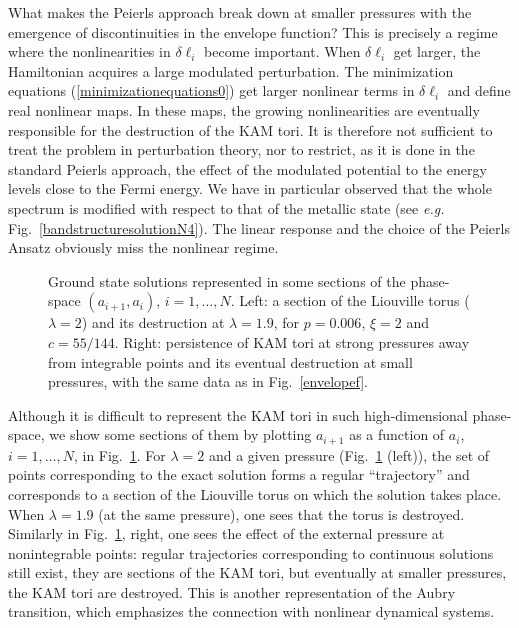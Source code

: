 \documentclass[]{revtex4-1}
\begin{document}
What makes the Peierls approach break down at smaller pressures with the emergence of discontinuities in the envelope function? This is precisely a regime where the nonlinearities in $\delta \ell_i$ become important.  When $\delta \ell_i$ get larger, the Hamiltonian acquires a large modulated perturbation. The minimization equations (\ref{minimizationequations0}) get larger nonlinear terms in $\delta \ell_i$ and define real nonlinear maps.  In these maps, the growing nonlinearities are eventually responsible for the destruction of the KAM tori.
It is therefore not sufficient to treat the problem in perturbation theory, nor to restrict, as it is done in the standard Peierls approach, the effect of the modulated potential to 
the energy levels close to the Fermi energy. We have in particular observed that the whole spectrum is modified with respect to that of the metallic state (see \textit{e.g.} Fig.~\ref{bandstructuresolutionN4}).  The linear response and the choice of the Peierls Ansatz obviously miss the nonlinear regime. 

\begin{figure}[h]
\begin{center} 
  \end{center}  \caption{Ground state solutions represented in some sections of the phase-space $(a_{i+1},a_i)$, $i=1,\dots,N$. Left: a section of the Liouville torus ($\lambda=2$) and its destruction  at $\lambda=1.9$, for $p=0.006$, $\xi=2$ and $c=55/144$. Right: persistence of KAM tori at strong pressures away from integrable points and its eventual destruction at small pressures, with the same data as in Fig.~\ref{envelopef}.}
  \label{KAMtori}
\end{figure}

Although it is difficult to represent the KAM tori in such high-dimensional phase-space, we show some sections of them by plotting $a_{i+1}$ as a function of $a_i$, $i=1,\dots,N$, in Fig.~\ref{KAMtori}.
For $\lambda=2$ and a given pressure (Fig.~\ref{KAMtori} (left)), the set of points corresponding to the exact solution forms a regular ``trajectory'' and corresponds to a section of the Liouville  torus on which the solution takes place. When $\lambda=1.9$ (at the same pressure), one sees that the torus is destroyed. Similarly in Fig.~\ref{KAMtori}, right, one sees the effect of the external pressure at nonintegrable points: regular trajectories corresponding to continuous solutions still exist, they are sections of the KAM tori, but eventually at smaller pressures, the KAM tori are destroyed.
This is another representation of the Aubry transition, which emphasizes the connection with nonlinear dynamical systems.
\end{document}
